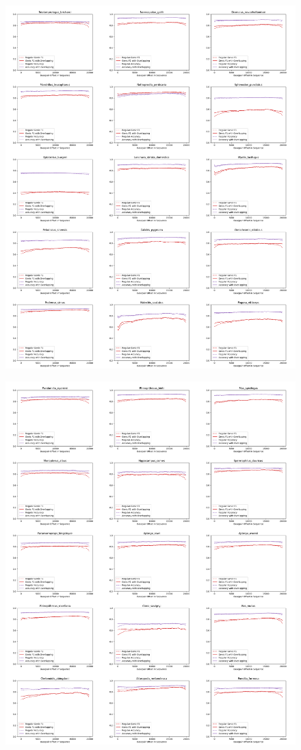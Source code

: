 \documentclass{article}
\begin{document}
\begin{figure}[!h]
\centerline{\includegraphics[width=1.2\textwidth]{images/overlapping/montage_animals9}}
\end{figure}
\begin{figure}[!h]
\centerline{\includegraphics[width=1.2\textwidth]{images/overlapping/montage_animals10}}
\end{figure}
\end{document}
